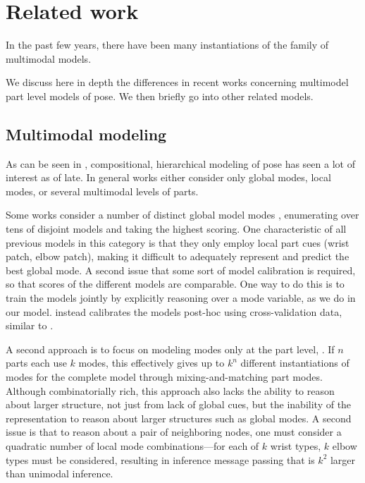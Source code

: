 \section{Related work}\label{sec:llps-rel}
 \begin{table}[bt!]
\begin{center}
{\small

}
\caption[Family of multimodal pose models.]{In the past few years, there have 
been many instantiations of the family of multimodal models. }
\label{tab:rel-work-ps} \end{center}
\end{table}

We discuss here in depth the differences in recent works concerning multimodel 
part level models of pose.  We then briefly go into other related models.

\subsection{Multimodal modeling}
As can be seen in , compositional, hierarchical modeling of 
pose has seen a lot of interest as of late.  In general works either consider 
only global modes, local modes, or several multimodal levels of parts.

 Some works consider a number of distinct 
global model modes \citep{everingham2011,ramanan-faces,wang2008multiple}, 
enumerating over tens of disjoint models and taking the highest scoring.  One 
characteristic of all previous models in this category is that they only employ 
local part cues (\eg wrist patch, elbow patch), making it difficult to 
adequately represent and predict the best global mode.  A second issue that 
some sort of model calibration is required, so that scores of the different 
models are comparable.  One way to do this is to train the models jointly by 
explicitly reasoning over a mode variable, as we do in our model.  
\citet{everingham2011} instead calibrates the models post-hoc using 
cross-validation data, similar to \citet{esvm}.

 A second approach is to focus on modeling modes only at 
the part level, \eg \citet{deva2011}.  If $n$ parts each use $k$ modes, this 
effectively gives up to $k^n$ different instantiations of modes for the 
complete model through mixing-and-matching part modes.  Although 
combinatorially rich, this approach also lacks the ability to reason about 
larger structure, not just from lack of global cues, but the inability of the 
representation to reason about larger structures such as global modes.  A 
second issue is that to reason about a pair of neighboring nodes, one must 
consider a quadratic number of local mode combinations---\eg for each of $k$ 
wrist types, $k$ elbow types must be considered, resulting in inference message 
passing that is $k^2$ larger than unimodal inference.

